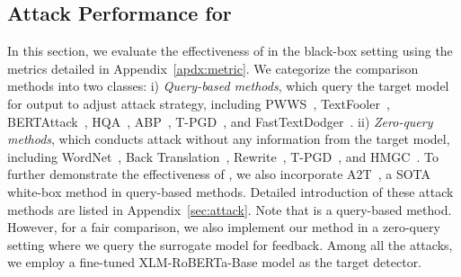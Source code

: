 \subsection{Attack Performance for \attackname}
\label{sec:GeneratorResult}
In this section, we evaluate the effectiveness of \attackname in the black-box setting using the metrics detailed in Appendix~\ref{apdx:metric}.
We categorize the comparison methods into two classes:
i) \textit{Query-based methods}, which query the target model for output to adjust attack strategy, including PWWS~\cite{ren2019generating}, TextFooler~\cite{jin2020bert}, BERTAttack~\cite{li2020bert},
HQA~\cite{liu2024hqa}, ABP~\cite{yu2024query}, T-PGD~\cite{yuan2023bridge}, and FastTextDodger~\cite{hu2024fasttextdodger}.
ii) \textit{Zero-query methods}, which conducts attack without any information from the target model, including WordNet~\cite{zhou2024humanizing}, Back Translation~\cite{zhou2024humanizing}, Rewrite~\cite{zhou2024humanizing}, 
T-PGD~\cite{yuan2023bridge}, and HMGC~\cite{zhou2024humanizing}.
To further demonstrate the effectiveness of \attackname, we also incorporate A2T~\cite{yoo2021towards},  a SOTA white-box method in query-based methods.
Detailed introduction of these attack methods are listed in Appendix~\ref{sec:attack}.
Note that \attackname is a query-based method.
However, for a fair comparison, we also implement our method in a zero-query setting where we query the surrogate model for feedback. 
Among all the attacks, we employ a fine-tuned XLM-RoBERTa-Base model \cite{conneau2019unsupervised}
as the target detector.


